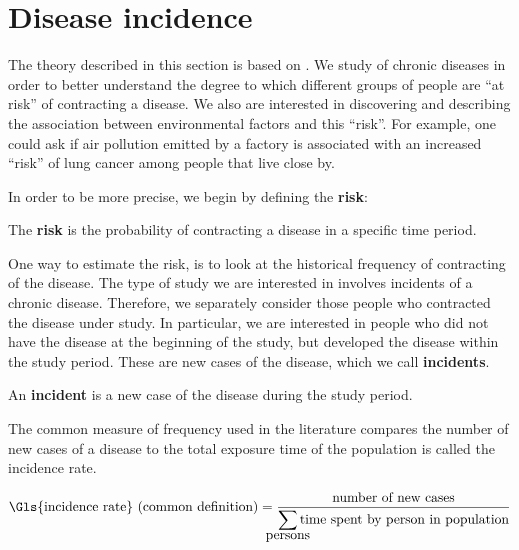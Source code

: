 

\section{Disease incidence}
\label{sec:theory:incidence}

The theory described in this section is based on \citet{rothman2008modern}.
We study of chronic diseases in order to better understand the degree to which different groups of people are ``at risk'' of contracting a disease.
We also are interested in discovering and describing the association between environmental factors and this ``risk''.
For example, one could ask if air pollution emitted by a factory is associated with an increased ``risk'' of lung cancer among people that live close by.

In order to be more precise, we begin by defining the \textbf{\gls{risk}}:

\begin{defn}
    The \textbf{\gls{risk}} is the probability of contracting a disease in a specific time period.
\end{defn}

One way to estimate the \gls{risk}, is to look at the historical frequency of contracting of the disease.
The type of study we are interested in involves incidents of a chronic disease.
Therefore, we separately consider those people who contracted the disease under study.
In particular, we are interested in people who did not have the disease at the beginning of the study,
but developed the disease within the study period.
These are new cases of the disease, which we call \textbf{\glspl{incident}}.

\begin{defn}
    An \textbf{\gls{incident}} is a new case of the disease during the study period.
\end{defn}

The common measure of frequency used in the literature compares the number of new cases of a disease to the total exposure time of the population is called the \gls{incidence rate}.

\begin{equation}
    \mbox{\Gls{incidence rate} (common definition)} = \frac{\mbox{number of new cases}}
                                {\displaystyle\smashoperator{\sum\limits_{\mbox{persons}}}\mbox{time spent by person in population}}
\end{equation}

